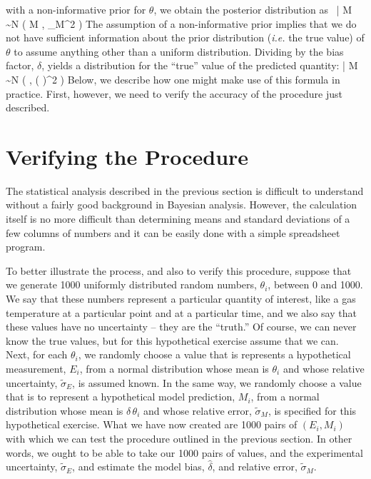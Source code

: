 with a non-informative prior for $\theta$, we obtain the posterior distribution as
\be
   \delta \, \theta \; | \; M \sim N \left( M \; , \; \sigma_M^2 \right) \label{thetaeq}
\ee
The assumption of a non-informative prior implies that we do not have sufficient information about the
prior distribution ({\em i.e.} the true value) of
$\theta$ to assume anything other than a uniform distribution.
Dividing by the bias factor, $\delta$, yields a distribution for the ``true'' value of the predicted quantity:
\be
   \theta \; | \; M \sim N \left(  \; , \;  \left(  \right)^2 \right) \label{truth}
\ee
Below, we describe how one might make use of this formula in practice.
First, however, we need to verify the accuracy of the procedure just described.

\section{Verifying the Procedure}

The statistical analysis described in the previous section is difficult to understand without a fairly good background in Bayesian analysis. However,
the calculation itself is no more difficult than determining means and standard deviations of a few columns of numbers and it can be easily done with
a simple spreadsheet program.

To better illustrate the process, and also to verify this procedure, suppose that we generate 1000 uniformly distributed
random numbers, $\theta_i$, between 0 and 1000. We say that these numbers represent a particular quantity of interest, like a gas temperature at a particular
point and at a particular time, and we also say that these values
have no uncertainty -- they are the ``truth.'' Of course, we can never know the true values, but for this hypothetical exercise assume that we can. Next, for each
$\theta_i$, we randomly choose a value that is represents a hypothetical measurement, $E_i$, from a normal distribution whose mean is $\theta_i$
and whose relative uncertainty, $\widetilde{\sigma}_E$, is assumed known. In the same way, we randomly choose a value that is to represent a hypothetical
model prediction, $M_i$, from a normal distribution whose mean is $\delta \, \theta_i$ and whose relative error, $\widetilde{\sigma}_M$, is
specified for this hypothetical exercise.
What we have now created are 1000 pairs of $(E_i,M_i)$ with which we can test the procedure outlined in the previous section. In other words, we ought to be
able to take our 1000 pairs of values, and the experimental uncertainty, $\widetilde{\sigma}_E$, and estimate the model bias, $\hat{\delta}$, and relative error,
$\widetilde{\sigma}_M$.

